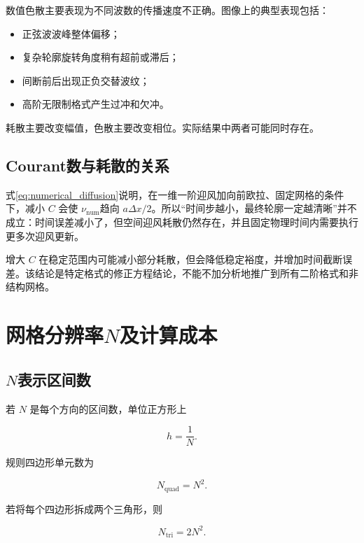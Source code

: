 \documentclass[UTF8,12pt,a4paper,fontset=fandol]{ctexart}
\numberwithin{equation}{section}
\begin{document}
数值色散主要表现为不同波数的传播速度不正确。图像上的典型表现包括：

\begin{itemize}
  \item 正弦波波峰整体偏移；
  \item 复杂轮廓旋转角度稍有超前或滞后；
  \item 间断前后出现正负交替波纹；
  \item 高阶无限制格式产生过冲和欠冲。
\end{itemize}

耗散主要改变幅值，色散主要改变相位。实际结果中两者可能同时存在。

\subsection{Courant数与耗散的关系}

式\eqref{eq:numerical_diffusion}说明，在一维一阶迎风加向前欧拉、固定网格的条件下，减小 $C$ 会使 $\nu_{\mathrm{num}}$趋向 $a\Delta x/2$。所以“时间步越小，最终轮廓一定越清晰”并不成立：时间误差减小了，但空间迎风耗散仍然存在，并且固定物理时间内需要执行更多次迎风更新。

增大 $C$ 在稳定范围内可能减小部分耗散，但会降低稳定裕度，并增加时间截断误差。该结论是特定格式的修正方程结论，不能不加分析地推广到所有二阶格式和非结构网格。

\section{网格分辨率\texorpdfstring{$N$}{N}及计算成本}

\subsection{\texorpdfstring{$N$}{N}表示区间数}

若 $N$ 是每个方向的区间数，单位正方形上

\begin{equation}
  h=\frac1N.
\end{equation}

规则四边形单元数为

\begin{equation}
  N_{\mathrm{quad}}=N^2.
\end{equation}

若将每个四边形拆成两个三角形，则

\begin{equation}
  N_{\mathrm{tri}}=2N^2.
\end{equation}
\end{document}
